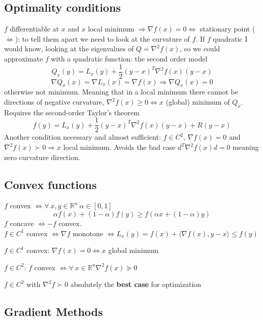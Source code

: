 \documentclass[10pt]{report}
\begin{document}
\subsection{Optimality conditions}
$f$ differentiable at $x$ and $x$ local minimum $\Rightarrow \nabla f(x) = 0 \Leftrightarrow$ stationary point ($\not\Leftarrow$): to tell them apart we need to look at the curvature of $f$. If $f$ quadratic I would know, looking at the eigenvalues of $Q = \nabla^2 f(x)$, so we could approximate $f$ with a quadratic function: the second order model $$Q_x(y) = L_x(y) + \frac{1}{2}(y-x)^T\nabla^2f(x)(y-x)$$
$$\nabla Q_x(x) = \nabla L_x(x) = \nabla f(x) \Rightarrow \nabla Q_x(x) = 0$$otherwise not minimum. Meaning that in a local minimum there cannot be directions of negative curvature, $\nabla^2 f(x) \geq 0 \Leftrightarrow x$ (global) minimum of $Q_x$. Requires the second-order Taylor's theorem
$$f(y) = L_x(y) + \frac{1}{2}(y-x)^T\nabla^2 f(x)(y-x) + R(y-x)$$
Another condition necessary and almost sufficient: $f\in C^2$, $\nabla f(x) = 0$ and $\nabla^2f(x)\succ 0\Rightarrow x$ local minimum. Avoids the bad case $d^T\nabla^2f(x)d=0$ meaning zero curvature direction.
\subsection{Convex functions}
$f$ convex $\Leftrightarrow \forall\:x,y\in\mathbb{R}^n\:\alpha\in [0,1]$
$$\alpha f(x) + (1-\alpha)f(y)\geq f(\alpha x+(1-\alpha)y)$$
$f$ concave $\Leftrightarrow -f$ convex.\\
$f\in C^1$ convex $\Leftrightarrow\nabla f$ monotone $\Leftrightarrow L_x(y) = f(x)+\langle\nabla f(x), y-x\rangle\leq f(y)$
\begin{list}{}{}
	\item $f\in C^1$ convex: $\nabla f(x) = 0\Leftrightarrow x$ global minimum
	\item $f\in C^2$: $f$ convex $\Leftrightarrow\forall\:x\in\mathbb{R}^n \nabla^2 f(x)\succeq 0$
	\item $f\in C^2$ with $\nabla^2 f\succ 0$ absolutely the \textbf{best case} for optimization
\end{list}
\subsection{Gradient Methods}
\end{document}
